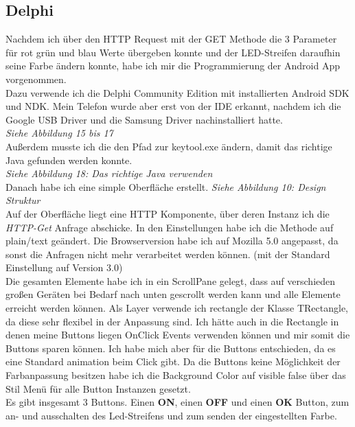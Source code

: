\subsection{Delphi}
Nachdem ich über den HTTP Request mit der GET Methode die 3 Parameter für rot grün und blau Werte übergeben konnte und der LED-Streifen daraufhin seine Farbe ändern konnte, habe ich mir die Programmierung der Android App vorgenommen.\\
Dazu verwende ich die Delphi Community Edition mit installierten Android SDK und NDK. Mein Telefon wurde aber erst von der IDE erkannt, nachdem ich die Google USB Driver und die Samsung Driver nachinstalliert hatte.\\
\textit{Siehe Abbildung 15 bis 17}\\
Außerdem musste ich die den Pfad zur keytool.exe ändern, damit das richtige Java gefunden werden konnte.\\
\textit{Siehe Abbildung 18: Das richtige Java verwenden}\\
Danach habe ich eine simple Oberfläche erstellt.
\textit{Siehe Abbildung 10: Design Struktur} \\
Auf der Oberfläche liegt eine HTTP Komponente, über deren Instanz ich die \textit{HTTP-Get} Anfrage abschicke. In den Einstellungen habe ich die Methode auf plain/text geändert. Die Browserversion habe ich auf Mozilla 5.0 angepasst, da sonst die Anfragen nicht mehr verarbeitet werden können. (mit der Standard Einstellung auf Version 3.0)\\
Die gesamten Elemente habe ich in ein ScrollPane gelegt, dass auf verschieden großen Geräten bei Bedarf nach unten gescrollt werden kann  und alle Elemente erreicht werden können. Als Layer verwende ich rectangle der Klasse TRectangle, da diese sehr flexibel in der Anpassung sind. Ich hätte auch in die Rectangle in denen meine Buttons liegen OnClick Events verwenden können und mir somit die Buttons sparen können. Ich habe mich aber für die Buttons entschieden, da es eine Standard animation beim Click gibt. Da die Buttons keine Möglichkeit der Farbanpassung besitzen habe ich die Background Color auf visible false über das Stil Menü für alle Button Instanzen gesetzt.\\
Es gibt insgesamt 3 Buttons. Einen \textbf{ON}, einen \textbf{OFF} und einen \textbf{OK} Button, zum an- und ausschalten des Led-Streifens und zum senden der eingestellten Farbe.\\
